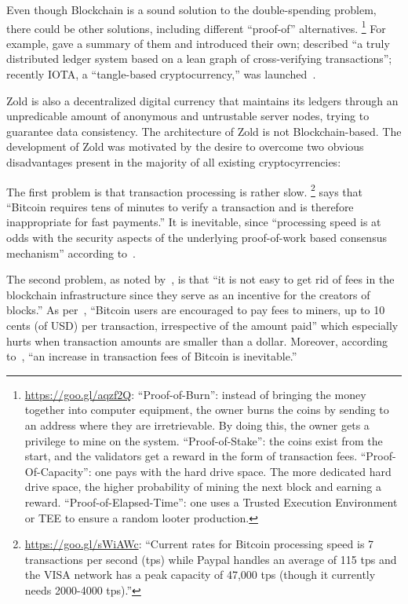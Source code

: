 \documentclass[11pt,oneside]{article}
\begin{document}
Even though Blockchain is a sound solution to the double-spending
problem, there could be other solutions,
including different ``proof-of'' alternatives.%
\footnote{%
  \url{https://goo.gl/aqzf2Q}:
  ``Proof-of-Burn'': instead of bringing the money together into computer equipment,
  the owner burns the coins by sending to an address where they are
  irretrievable. By doing this, the owner gets a privilege to
  mine on the system.
  ``Proof-of-Stake'': the coins exist from the start, and
  the validators get a reward in the form of transaction fees.
  ``Proof-Of-Capacity'': one pays with the hard drive space. The more
  dedicated hard drive space, the higher probability of mining
  the next block and earning a reward.
  ``Proof-of-Elapsed-Time'': one uses a Trusted Execution Environment or TEE
  to ensure a random looter production.
}
For example, \textcite{everaere2010} gave
a summary of them and introduced their own;
\textcite{boyen2016} described
``a truly distributed ledger system based on a lean graph of cross-verifying transactions'';
recently IOTA, a ``tangle-based cryptocurrency,'' was launched~\parencite{popov2017}.

Zold is also a decentralized digital currency that maintains its ledgers
through an unpredicable amount of anonymous and untrustable server nodes, trying to guarantee
data consistency. The architecture of Zold is not Blockchain-based.
The development of Zold was motivated by the desire to overcome
two obvious disadvantages present in the majority of all existing cryptocyrrencies:

The first problem is that transaction processing is rather slow.%
\footnote{%
  \url{https://goo.gl/sWiAWc}:
  ``Current rates for Bitcoin processing
  speed is 7 transactions per second (tps) while Paypal handles
  an average of 115 tps and the VISA
  network has a peak capacity of 47,000 tps (though it currently needs 2000-4000 tps).''
}
\textcite{karame2012} says that ``Bitcoin requires tens of minutes to verify a transaction
and is therefore inappropriate for fast payments.''
It is inevitable, since
``processing speed is at odds with the security aspects of the underlying
proof-of-work based consensus mechanism'' according to~\textcite{kiayias2015}.

The second problem, as noted by~\textcite{popov2017}, is that ``it is not easy to get rid
of fees in the blockchain infrastructure since they serve
as an incentive for the creators of blocks.''
As per~\textcite{moser2015}, ``Bitcoin users are encouraged to
pay fees to miners, up to 10 cents (of USD) per transaction, irrespective of the
amount paid'' which especially hurts when transaction amounts are smaller than a dollar.
Moreover, according to~\textcite{kaskaloglu2014},
``an increase in transaction fees of Bitcoin is inevitable.''
\end{document}
